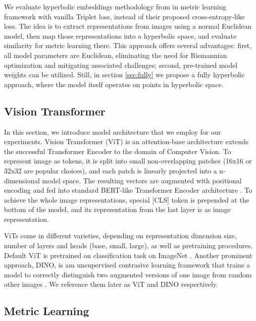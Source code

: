 \documentclass[10pt, letterpaper, twocolumn]{article}
\begin{document}
We evaluate hyperbolic embeddings methodology from \cite{ermolov_hyperbolic_2022} in metric learning framework with vanilla Triplet loss, instead of their proposed cross-entropy-like loss.
The idea is to extract representations from images using a normal Euclidean model, then map those representations into a hyperbolic space, and evaluate similarity for metric learning there. This approach offers several advantages: first, all model parameters are Euclidean, eliminating the need for Riemannian optimization and mitigating associated challenges; second, pre-trained model weights can be utilized. Still, in section \ref{sec:fully} we propose a fully hyperbolic approach, where the model itself operates on points in hyperbolic space.

\subsection{Vision Transformer}

In this section, we introduce model architecture that we employ for our experiments. Vision Transformer (ViT) \cite{dosovitskiy_image_2021, vaswani_attention_2017} is an attention-base architecture extends the successful Transformer Encoder to the domain of Computer Vision. To represent image as tokens, it is split into small non-overlapping patches (16x16 or 32x32 are popular choices), and each patch is linearly projected into a n-dimensional model space. The resulting vectors are augmented with positional encoding and fed into standard BERT-like Transformer Encoder architecture \cite{devlin_bert_2019}. To achieve the whole image representations, special [CLS] token is prepended at the bottom of the model, and its representation from the last layer is as image representation.

ViTs come in different varieties, depending on representation dimension size, number of layers and heads (base, small, large), as well as pretraining procedures.
Default ViT is pretrained on classification task on ImageNet \cite{deng_imagenet_2009}. Another prominent approach, DINO, is am unsupervised contrasive learning framework that trains a model to correctly distinguish two augmented versions of one image from random other images \cite{caron_emerging_2021, oquab_dinov2_2023}. We reference them later as ViT and DINO respectively.

\subsection{Metric Learning}
\end{document}
